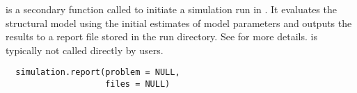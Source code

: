 %
\begin{Description}\relax
{} is a secondary function called to initiate a 
simulation run in . It evaluates the structural model using the
initial estimates of model parameters and outputs the results to a report file
stored in the run directory. See  
for more details.  is typically not called directly
by users.
\end{Description}
%
\begin{Usage}
\begin{verbatim}
  simulation.report(problem = NULL,
                    files = NULL)
\end{verbatim}
\end{Usage}
%
